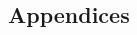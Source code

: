%

%



\clearpage
\begin{multicols}{2}
	
\printbibliography
\clearpage
\end{multicols}


\cleardoublepage
\begin{appendices}
	\chapter{Appendices}

\clearpage

\end{appendices}



